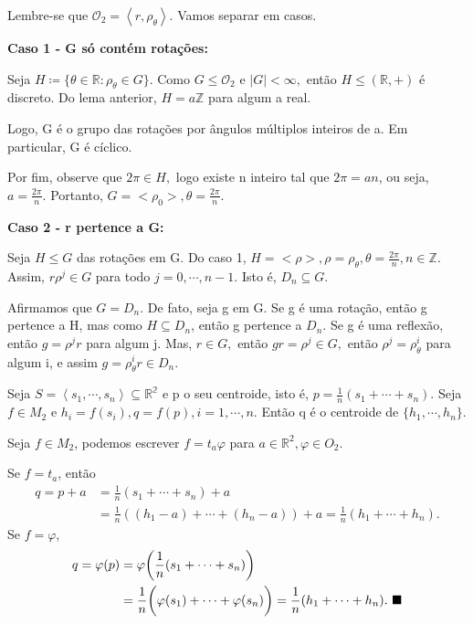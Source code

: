 \documentclass[Algebra/algebra_notes.tex]{subfiles}
\begin{document}
\begin{proof*}
	Lembre-se que \(\mathcal{O}_{2} = \left< r, \rho _{\theta } \right>\). Vamos separar em casos.

	\textbf{Caso 1 - G só contém rotações:}

	Seja \(H\coloneqq \{\theta \in \mathbb{R}: \rho _{\theta }\in G\}\). Como
	\(G\leq \mathcal{O}_{2}\) e \(|G| < \infty,\) então \(H\leq (\mathbb{R}, +)\)
	é discreto. Do lema anterior, \(H = a \mathbb{Z}\) para algum a real.

	Logo, G é o grupo das rotações por ângulos múltiplos inteiros de a. Em
	particular, G é cíclico.

	Por fim, observe que \(2\pi \in H,\) logo existe n inteiro tal que \(2\pi =an\),
	ou seja, \(a = \frac{2\pi }{n}.\) Portanto, \(G = <\rho_{0}>, \theta =\frac{2\pi }{n}\).

	\textbf{Caso 2 - r pertence a G:}

	Seja \(H\leq G\) das rotações em G. Do caso 1, \(H = <\rho >, \rho = \rho _{\theta }, \theta =\frac{2\pi }{n}, n\in \mathbb{Z}\).
	Assim, \(r\rho^{j}\in G\) para todo \(j=0, \cdots, n-1.\) Isto é, \(D_{n}\subseteq{G}\).

	Afirmamos que \(G=D_{n}\). De fato, seja g em G. Se g é uma rotação, então
	g pertence a H, mas como \(H\subseteq{D_{n}}\), então g pertence a \(D_{n}\).
	Se g é uma reflexão, então \(g=\rho^{j}r\) para algum j. Mas, \(r\in G,\) então
	\(gr = \rho^{j}\in G,\) então \(\rho ^{j}=\rho _{\theta }^{i}\) para algum i,
	e assim \(g=\rho _{\theta }^{i}r\in D_{n}\). \qedsymbol
\end{proof*}
\begin{lemma*}
	Seja \(S = \left< s_{1}, \cdots, s_{n} \right>\subseteq{\mathbb{R^{2}}}\) e
	p o seu centroide, isto é, \(p=\frac{1}{n}(s_{1} + \cdots + s_{n})\). Seja \(f\in M_{2}\)
	e \(h_{i}=f(s_{i}), q=f(p), i = 1,\cdots,n.\) Então q é o centroide de
	\(\{h_{1}, \cdots, h_{n}\}\).
\end{lemma*}
\begin{proof*}
	Seja \(f\in M_{2}\), podemos escrever \(f=t_{a}\varphi \) para \(a\in \mathbb{R}^{2}, \varphi \in O_{2}\).

	Se \(f=t_{a}\), então
	\begin{align*}
		q = p + a & =\frac{1}{n}(s_{1}+\cdots+s_{n})+a                                              \\
		          & =\frac{1}{n}((h_{1}-a)+\cdots+(h_{n}-a)) + a = \frac{1}{n}(h_{1}+\cdots+h_{n}).
	\end{align*}
	Se \(f=\varphi \),
	\begin{align*}
		q = \varphi (p) & = \varphi \biggl(\frac{1}{n}(s_{1}+\cdots+s_{n})\biggr)                                                               \\
		                & =\frac{1}{n}\biggl(\varphi (s_{1})+\cdots+\varphi (s_{n})\biggr) = \frac{1}{n}(h_{1}+\cdots+h_{n}).\text{ $\blacksquare$}
	\end{align*}
\end{proof*}
\end{document}
